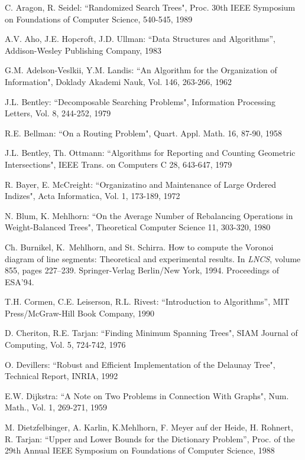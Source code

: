 \begin{thebibliography}{99}
{C. Aragon, R. Seidel: ``Randomized Search Trees", Proc. 30th IEEE Symposium 
 on Foundations of Computer Science, 540-545, 1989}

{A.V. Aho, J.E. Hopcroft, J.D. Ullman: ``Data Structures and 
Algorithms'', Addison-Wesley Publishing Company, 1983}

{G.M. Adelson-Veslkii, Y.M. Landis: ``An Algorithm for the Organization of
Information", Doklady Akademi Nauk, Vol. 146, 263-266, 1962}

{J.L. Bentley: ``Decomposable Searching Problems", Information Processing
Letters, Vol. 8, 244-252, 1979}

{R.E. Bellman: ``On a Routing Problem", Quart. Appl. Math. 16, 87-90, 1958}

{J.L. Bentley, Th. Ottmann: ``Algorithms for Reporting and Counting
Geometric Intersections", IEEE Trans. on Computers C 28, 643-647, 1979 }

{R. Bayer, E. McCreight: ``Organizatino and Maintenance of Large Ordered 
 Indizes", Acta Informatica, Vol. 1, 173-189, 1972}

{N. Blum, K. Mehlhorn: ``On the Average Number of Rebalancing Operations in 
Weight-Balanced Trees", Theoretical Computer Science 11, 303-320, 1980}

Ch. Burnikel, K.~Mehlhorn, and St. Schirra.
\newblock How to compute the {V}oronoi diagram of line segments: {T}heoretical
  and experimental results.
\newblock In {\em LNCS}, volume 855, pages 227--239. Springer-Verlag Berlin/New
  York, 1994.
\newblock Proceedings of ESA'94.

{T.H. Cormen, C.E. Leiserson, R.L. Rivest: ``Introduction to Algorithms'', 
MIT Press/McGraw-Hill Book Company, 1990 }

{D. Cheriton, R.E. Tarjan: ``Finding Minimum Spanning Trees", SIAM Journal
 of Computing, Vol. 5, 724-742, 1976}

{ O. Devillers: ``Robust and Efficient Implementation of the Delaunay Tree",
Technical Report, INRIA, 1992}

{E.W. Dijkstra: ``A Note on Two Problems in Connection With Graphs", Num.
 Math., Vol. 1, 269-271, 1959}

{M. Dietzfelbinger, A. Karlin, K.Mehlhorn, F. Meyer 
auf der Heide, H. Rohnert, R. Tarjan: ``Upper and Lower Bounds for
the Dictionary Problem'', Proc. of the 29th Annual IEEE Symposium on
Foundations of Computer Science, 1988}


\end{thebibliography}
